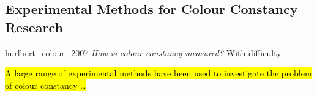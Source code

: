 \subsection{Experimental Methods for Colour Constancy Research}

\begin{citequote}{hurlbert_colour_2007}
\emph{How is colour constancy measured?} With difficulty.
\end{citequote}


\hl{A large range of experimental methods have been used to investigate the problem of colour constancy \dots} %
 
